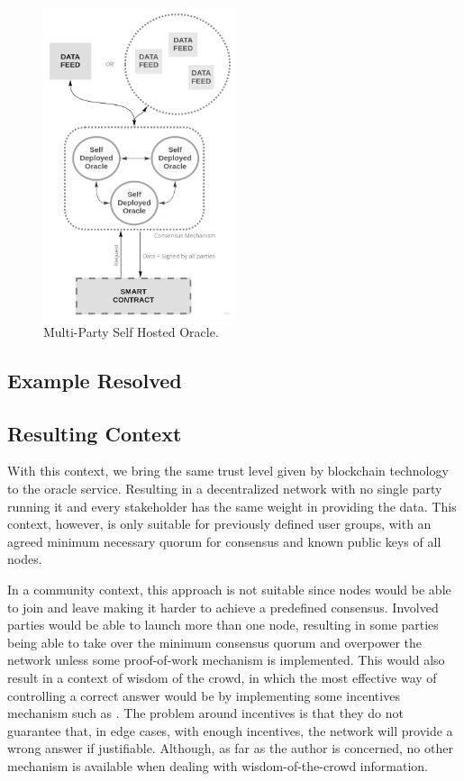 \begin{figure}[t]
  \begin{center}
    \leavevmode
    \includegraphics[width=0.5\textwidth]{figures/oraclearch4.jpg}
    \caption{Multi-Party Self Hosted Oracle.}
    \label{fig:/figures/MPSelfHostedOracle}
  \end{center}
\end{figure}

\subsection{Example Resolved}
\subsection{Resulting Context}
With this context, we bring the same trust level given by blockchain technology to the oracle service. Resulting in a decentralized network with no single party running it and every stakeholder has the same weight in providing the data. This context, however, is only suitable for previously defined user groups, with an agreed minimum necessary quorum for consensus and known public keys of all nodes.

In a community context, this approach is not suitable since nodes would be able to join and leave making it harder to achieve a predefined consensus. Involved parties would be able to launch more than one node, resulting in some parties being able to take over the minimum consensus quorum and overpower the network unless some proof-of-work mechanism is implemented. This would also result in a context of wisdom of the crowd, in which the most effective way of controlling a correct answer would be by implementing some incentives mechanism such as \cite{Adler2018a}. The problem around incentives is that they do not guarantee that, in edge cases, with enough incentives, the network will provide a wrong answer if justifiable. Although, as far as the author is concerned, no other mechanism is available when dealing with wisdom-of-the-crowd information.



